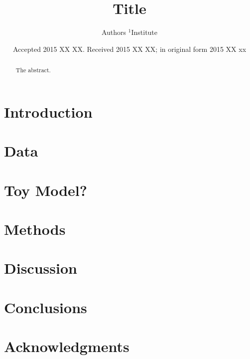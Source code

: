 \documentclass[useAMS,usenatbib]{mn2e}
\title[Title]{Title}
\author[Authors et al.]{Authors
$^{1}$Institute\\}
\begin{document}
\date{Accepted 2015 XX XX. Received 2015 XX XX; in original form 2015 XX xx}

\pagerange{\pageref{firstpage}--\pageref{lastpage}} 

\maketitle

\label{firstpage}

\begin{abstract}
The abstract.
\end{abstract}

\begin{keywords}
\end{keywords}

\section{Introduction}

\section[]{Data}

\section[]{Toy Model?}

\section[]{Methods}

\section[]{Discussion}

\section{Conclusions}


\section*{Acknowledgments}



\begin{thebibliography}{99}
\end{thebibliography}


\label{lastpage}
\end{document}
